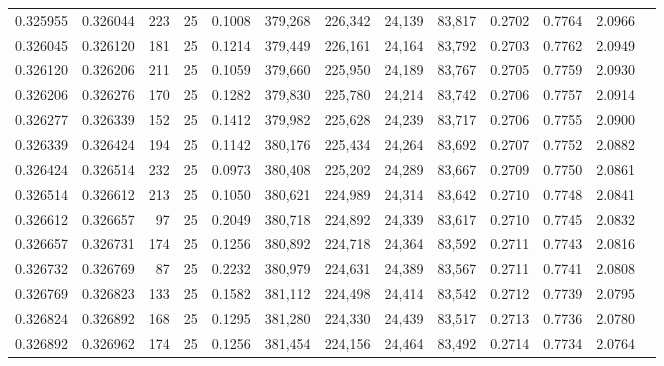 \begin{tabular}{rrrrrrrrrrrrr}
0.325955 & 0.326044 &   223 &  25 &                                     0.1008 & 379,268 & 226,342 &  24,139 &  83,817 & 0.2702 & 0.7764 & 2.0966 \\
0.326045 & 0.326120 &   181 &  25 &                                     0.1214 & 379,449 & 226,161 &  24,164 &  83,792 & 0.2703 & 0.7762 & 2.0949 \\
0.326120 & 0.326206 &   211 &  25 &                                     0.1059 & 379,660 & 225,950 &  24,189 &  83,767 & 0.2705 & 0.7759 & 2.0930 \\
0.326206 & 0.326276 &   170 &  25 &                                     0.1282 & 379,830 & 225,780 &  24,214 &  83,742 & 0.2706 & 0.7757 & 2.0914 \\
0.326277 & 0.326339 &   152 &  25 &                                     0.1412 & 379,982 & 225,628 &  24,239 &  83,717 & 0.2706 & 0.7755 & 2.0900 \\
0.326339 & 0.326424 &   194 &  25 &                                     0.1142 & 380,176 & 225,434 &  24,264 &  83,692 & 0.2707 & 0.7752 & 2.0882 \\
0.326424 & 0.326514 &   232 &  25 &                                     0.0973 & 380,408 & 225,202 &  24,289 &  83,667 & 0.2709 & 0.7750 & 2.0861 \\
0.326514 & 0.326612 &   213 &  25 &                                     0.1050 & 380,621 & 224,989 &  24,314 &  83,642 & 0.2710 & 0.7748 & 2.0841 \\
0.326612 & 0.326657 &    97 &  25 &                                     0.2049 & 380,718 & 224,892 &  24,339 &  83,617 & 0.2710 & 0.7745 & 2.0832 \\
0.326657 & 0.326731 &   174 &  25 &                                     0.1256 & 380,892 & 224,718 &  24,364 &  83,592 & 0.2711 & 0.7743 & 2.0816 \\
0.326732 & 0.326769 &    87 &  25 &                                     0.2232 & 380,979 & 224,631 &  24,389 &  83,567 & 0.2711 & 0.7741 & 2.0808 \\
0.326769 & 0.326823 &   133 &  25 &                                     0.1582 & 381,112 & 224,498 &  24,414 &  83,542 & 0.2712 & 0.7739 & 2.0795 \\
0.326824 & 0.326892 &   168 &  25 &                                     0.1295 & 381,280 & 224,330 &  24,439 &  83,517 & 0.2713 & 0.7736 & 2.0780 \\
0.326892 & 0.326962 &   174 &  25 &                                     0.1256 & 381,454 & 224,156 &  24,464 &  83,492 & 0.2714 & 0.7734 & 2.0764 \\

\end{tabular}
